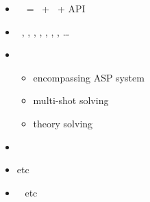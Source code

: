 \begin{frame}{\clingo}
  \begin{itemize}
  \item {} \ \clingo\ = \gringo\ + \clasp\ + API
  \item {} \
    \C,
    \cpp,
    \java,
    \lua,
    \prolog,
    \python,
    \rust,
    \dots
  \item {} \
    \begin{itemize}
    \item encompassing ASP system
    \item multi-shot solving
    \item theory solving
    \end{itemize}
  \item {} \ \cite{gekakasc17a,jakaosscscwa17a,karoscwa21a}
  \item {} \par
    \cite{liutru13a,gamarowawo15a,erdher20a,erfimapr20a,bojawe19a,schwitter12a,dabmar20a,ngstsoye20a,smanmapo12a,cosmma12a,dikophps20a,wotawa20a,bogerd20a,aisaam18a,becadolemamava21a,izmerd20a} etc
  \item \structure{Systems} \
    \cite{cafamu20a,bablee13a,scbhsuwa18a,tepfri18a,dvrawawo20a,bainkaokscsotawa18a,reraigpajh19a,eikarescwe17a} etc
  \end{itemize}
\end{frame}
%
